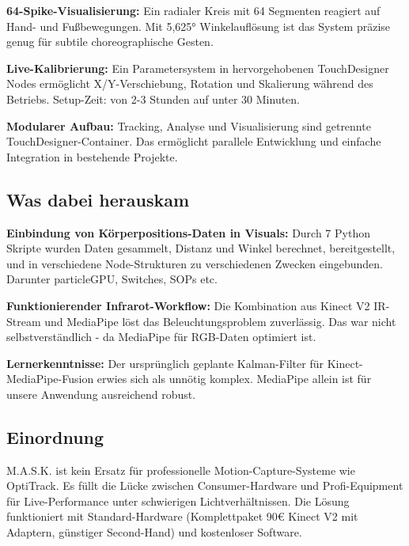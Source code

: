 \textbf{64-Spike-Visualisierung:}
Ein radialer Kreis mit 64 Segmenten reagiert auf Hand- und Fußbewegungen. Mit 5,625° Winkelauflösung ist das System präzise genug für subtile choreographische Gesten.

\textbf{Live-Kalibrierung:}
Ein Parametersystem in hervorgehobenen TouchDesigner Nodes ermöglicht X/Y-Verschiebung, Rotation und Skalierung während des Betriebs. Setup-Zeit: von 2-3 Stunden auf unter 30 Minuten.

\textbf{Modularer Aufbau:}
Tracking, Analyse und Visualisierung sind getrennte TouchDesigner-Container. Das ermöglicht parallele Entwicklung und einfache Integration in bestehende Projekte.

\subsection{Was dabei herauskam}

\textbf{Einbindung von Körperpositions-Daten in Visuals:}
Durch 7 Python Skripte wurden Daten gesammelt, Distanz und Winkel berechnet, bereitgestellt, und in verschiedene Node-Strukturen zu verschiedenen Zwecken eingebunden. Darunter particleGPU, Switches, SOPs etc.

\textbf{Funktionierender Infrarot-Workflow:}
Die Kombination aus Kinect V2 IR-Stream und MediaPipe löst das Beleuchtungsproblem zuverlässig. Das war nicht selbstverständlich - da MediaPipe für RGB-Daten optimiert ist.

\textbf{Lernerkenntnisse:}
Der ursprünglich geplante Kalman-Filter für Kinect-MediaPipe-Fusion erwies sich als unnötig komplex. MediaPipe allein ist für unsere Anwendung ausreichend robust.

\subsection{Einordnung}

M.A.S.K. ist kein Ersatz für professionelle Motion-Capture-Systeme wie OptiTrack. Es füllt die Lücke zwischen Consumer-Hardware und Profi-Equipment für Live-Performance unter schwierigen Lichtverhältnissen. Die Lösung funktioniert mit Standard-Hardware (Komplettpaket 90€ Kinect V2 mit Adaptern, günstiger Second-Hand) und kostenloser Software.